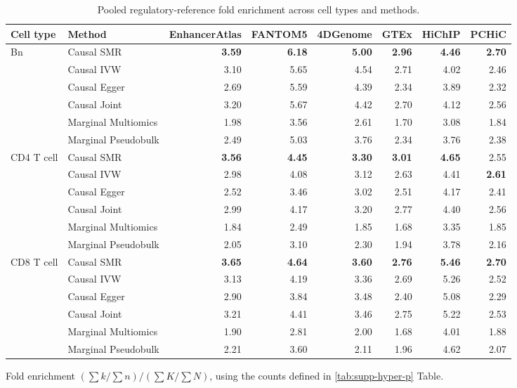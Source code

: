 \begin{table}[htbp]
\centering
\caption[Pooled fold enrichment]{Pooled regulatory-reference fold enrichment across cell types and methods.}
\label{tab:supp-hyper-fold}
\begingroup
\small
\singlespacing
\setlength{\tabcolsep}{2.5pt}
\renewcommand{\arraystretch}{1.35}
\begin{tabular}{@{}llrrrrrr@{}}
\toprule
Cell type & Method & EnhancerAtlas & FANTOM5 & 4DGenome & GTEx & HiChIP & PCHiC \\
\midrule
Bn & Causal SMR & \textbf{3.59} & \textbf{6.18} & \textbf{5.00} & \textbf{2.96} & \textbf{4.46} & \textbf{2.70} \\
 & Causal IVW & 3.10 & 5.65 & 4.54 & 2.71 & 4.02 & 2.46 \\
 & Causal Egger & 2.69 & 5.59 & 4.39 & 2.34 & 3.89 & 2.32 \\
 & Causal Joint & 3.20 & 5.67 & 4.42 & 2.70 & 4.12 & 2.56 \\
 & Marginal Multiomics & 1.98 & 3.56 & 2.61 & 1.70 & 3.08 & 1.84 \\
 & Marginal Pseudobulk & 2.49 & 5.03 & 3.76 & 2.34 & 3.76 & 2.38 \\
\midrule
CD4 T cell & Causal SMR & \textbf{3.56} & \textbf{4.45} & \textbf{3.30} & \textbf{3.01} & \textbf{4.65} & 2.55 \\
 & Causal IVW & 2.98 & 4.08 & 3.12 & 2.63 & 4.41 & \textbf{2.61} \\
 & Causal Egger & 2.52 & 3.46 & 3.02 & 2.51 & 4.17 & 2.41 \\
 & Causal Joint & 2.99 & 4.17 & 3.20 & 2.77 & 4.40 & 2.56 \\
 & Marginal Multiomics & 1.84 & 2.49 & 1.85 & 1.68 & 3.35 & 1.85 \\
 & Marginal Pseudobulk & 2.05 & 3.10 & 2.30 & 1.94 & 3.78 & 2.16 \\
\midrule
CD8 T cell & Causal SMR & \textbf{3.65} & \textbf{4.64} & \textbf{3.60} & \textbf{2.76} & \textbf{5.46} & \textbf{2.70} \\
 & Causal IVW & 3.13 & 4.19 & 3.36 & 2.69 & 5.26 & 2.52 \\
 & Causal Egger & 2.90 & 3.84 & 3.48 & 2.40 & 5.08 & 2.29 \\
 & Causal Joint & 3.21 & 4.41 & 3.46 & 2.75 & 5.22 & 2.53 \\
 & Marginal Multiomics & 1.90 & 2.81 & 2.00 & 1.68 & 4.01 & 1.88 \\
 & Marginal Pseudobulk & 2.21 & 3.60 & 2.11 & 1.96 & 4.62 & 2.07 \\
\bottomrule
\end{tabular}
\par\medskip
\begin{minipage}{\linewidth}
\footnotesize
Fold enrichment \((\sum k/\sum n)/(\sum K/\sum N)\),
using the counts defined in \ref{tab:supp-hyper-p} Table.
\end{minipage}
\endgroup
\end{table}
